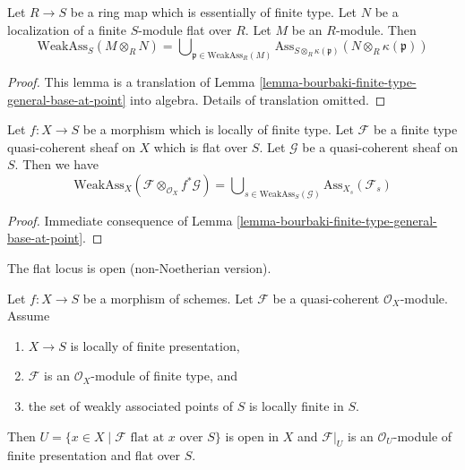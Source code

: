 \begin{lemma}
\label{lemma-weak-bourbaki}
Let $R \to S$ be a ring map which is essentially of finite type.
Let $N$ be a localization of a finite $S$-module flat over $R$.
Let $M$ be an $R$-module. Then
$$
\text{WeakAss}_S(M \otimes_R N)
=
\bigcup\nolimits_{\mathfrak p \in \text{WeakAss}_R(M)}
\text{Ass}_{S \otimes_R \kappa(\mathfrak p)}(N \otimes_R \kappa(\mathfrak p))
$$
\end{lemma}

\begin{proof}
This lemma is a translation of
Lemma \ref{lemma-bourbaki-finite-type-general-base-at-point}
into algebra. Details of translation omitted.
\end{proof}

\begin{lemma}
\label{lemma-bourbaki-finite-type-general-base}
Let $f : X \to S$ be a morphism which is locally of finite type.
Let $\mathcal{F}$ be a finite type quasi-coherent sheaf on $X$
which is flat over $S$. Let $\mathcal{G}$ be a quasi-coherent sheaf on $S$.
Then we have
$$
\text{WeakAss}_X(\mathcal{F} \otimes_{\mathcal{O}_X} f^*\mathcal{G}) =
\bigcup\nolimits_{s \in \text{WeakAss}_S(\mathcal{G})}
\text{Ass}_{X_s}(\mathcal{F}_s)
$$
\end{lemma}

\begin{proof}
Immediate consequence of
Lemma \ref{lemma-bourbaki-finite-type-general-base-at-point}.
\end{proof}

\begin{theorem}
\label{theorem-finite-type-flat}
\begin{slogan}
The flat locus is open (non-Noetherian version).
\end{slogan}
Let $f : X \to S$ be a morphism of schemes.
Let $\mathcal{F}$ be a quasi-coherent $\mathcal{O}_X$-module.
Assume
\begin{enumerate}
\item $X \to S$ is locally of finite presentation,
\item $\mathcal{F}$ is an $\mathcal{O}_X$-module of finite type, and
\item the set of weakly associated points of $S$ is locally finite in $S$.
\end{enumerate}
Then $U = \{x \in X \mid \mathcal{F}\text{ flat at }x\text{ over }S\}$
is open in $X$ and $\mathcal{F}|_U$ is an $\mathcal{O}_U$-module
of finite presentation and flat over $S$.
\end{theorem}

